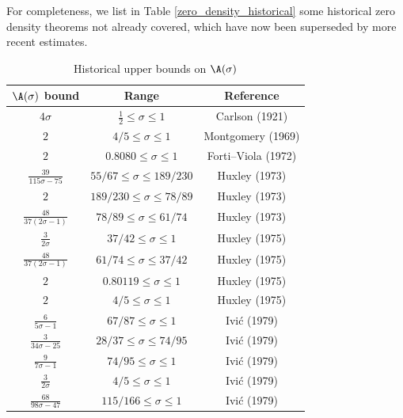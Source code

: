 For completeness, we list in Table \ref{zero_density_historical} some historical zero density theorems not already covered, which have now been superseded by more recent estimates.

\begin{table}[ht]
    \def\arraystretch{1.3}
    \centering
    \caption{Historical upper bounds on $\A(\sigma)$}
    \begin{tabular}{|c|c|c|}
    \hline
    $\A(\sigma)$ bound & Range & Reference\\
    \hline
    $4\sigma$ & $\frac{1}{2} \leq \sigma \le 1$ & Carlson (1921) \cite{carlson_uber_1921}\\
    \hline
    $2$ & $4/5 \leq \sigma \leq 1$ & Montgomery (1969) \cite{montgomery_1969} \\
    \hline
    $2$ & $0.8080 \leq \sigma \leq 1$ & Forti--Viola (1972) \cite{forti-viola} \\
    \hline
    $\frac{39}{115\sigma-75}$ & $55/67 \leq \sigma \leq 189/230$ & Huxley (1973) \cite{huxley_large_1973} \\
    \hline
    $2$ & $189/230 \leq \sigma \leq 78/89$ & Huxley (1973) \cite{huxley_large_1973} \\
    \hline
    $\frac{48}{37(2\sigma-1)}$ & $78/89 \leq \sigma \leq 61/74$ & Huxley (1973) \cite{huxley_large_1973} \\
    \hline
    $\frac{3}{2\sigma}$ & $37/42 \leq \sigma \leq 1$ & Huxley (1975) \cite{huxley_large_1975a}\\
    \hline
    $\frac{48}{37(2\sigma-1)}$ & $61/74 \leq \sigma \leq 37/42$ & Huxley (1975) \cite{huxley_large_1975a}\\
    \hline
    $2$ & $0.80119 \leq \sigma \leq 1$ & Huxley (1975) \cite{huxley_large_1975a}\\
    \hline
    $2$ & $4/5 \leq \sigma \leq 1$ & Huxley (1975) \cite{huxley_large_1975b}\\
    \hline
    $\frac{6}{5\sigma-1}$ & $67/87 \leq \sigma \leq 1$ & Ivi\'c (1979) \cite{ivic_note_1979} \\
    \hline
    $\frac{3}{34\sigma-25}$ & $28/37 \leq \sigma \leq 74/95$ & Ivi\'c (1979) \cite{ivic_note_1979} \\
    \hline
    $\frac{9}{7\sigma-1}$ & $74/95 \leq \sigma \leq 1$ & Ivi\'c (1979) \cite{ivic_note_1979} \\
    \hline
    $\frac{3}{2\sigma}$ & $4/5 \leq \sigma \leq 1$ & Ivi\'c (1979) \cite{ivic_note_1979} \\
    \hline
    $\frac{68}{98\sigma-47}$ & $115/166 \leq \sigma \leq 1$ & Ivi\'c (1979) \cite{ivic_note_1979} \\

\end{tabular}
\end{table}
